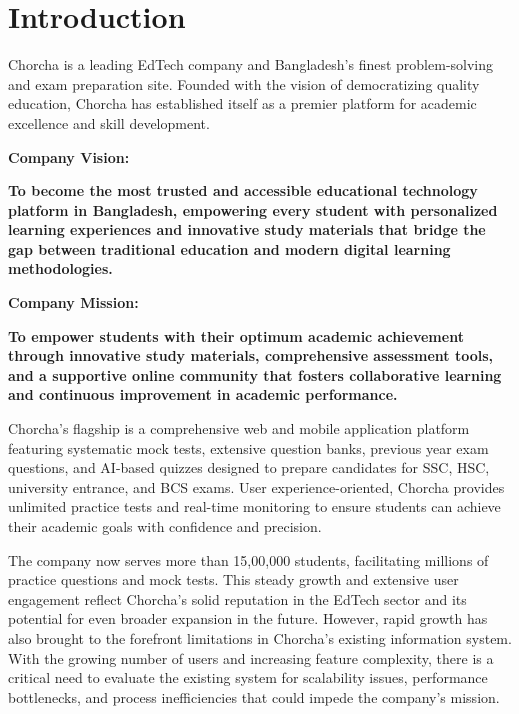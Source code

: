\documentclass[12pt,a4paper,oneside]{book}
\begin{document}
\section{Introduction}

Chorcha is a leading EdTech company and Bangladesh's finest problem-solving and exam preparation site. Founded with the vision of democratizing quality education, Chorcha has established itself as a premier platform for academic excellence and skill development.

\vspace{0.5cm}

\textbf{\textcolor{chapterblue}{Company Vision:}} \\
\colorbox{chapterblue!10}{\parbox{0.95\textwidth}{\textcolor{chapterblue}{\textbf{To become the most trusted and accessible educational technology platform in Bangladesh, empowering every student with personalized learning experiences and innovative study materials that bridge the gap between traditional education and modern digital learning methodologies.}}}}

\vspace{0.5cm}

\textbf{\textcolor{chapterblue}{Company Mission:}} \\
\colorbox{chapterblue!10}{\parbox{0.95\textwidth}{\textcolor{chapterblue}{\textbf{To empower students with their optimum academic achievement through innovative study materials, comprehensive assessment tools, and a supportive online community that fosters collaborative learning and continuous improvement in academic performance.}}}}

\vspace{0.5cm}

Chorcha's flagship is a comprehensive web and mobile application platform featuring systematic mock tests, extensive question banks, previous year exam questions, and AI-based quizzes designed to prepare candidates for SSC, HSC, university entrance, and BCS exams. User experience-oriented, Chorcha provides unlimited practice tests and real-time monitoring to ensure students can achieve their academic goals with confidence and precision.

The company now serves more than 15,00,000 students, facilitating millions of practice questions and mock tests. This steady growth and extensive user engagement reflect Chorcha's solid reputation in the EdTech sector and its potential for even broader expansion in the future. However, rapid growth has also brought to the forefront limitations in Chorcha's existing information system. With the growing number of users and increasing feature complexity, there is a critical need to evaluate the existing system for scalability issues, performance bottlenecks, and process inefficiencies that could impede the company's mission.
\end{document}
